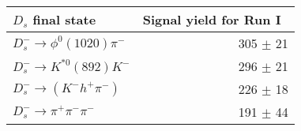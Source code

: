  \begin{tabular}{l r }
\hline\hline
$D_s$ final state  & Signal yield for Run I\ \\
\hline
$D_{s}^{-} \to \phi^{0}(1020)\pi^{-}$ & 305 $\pm$ 21 \\
$D_{s}^{-}\to K^{*0}(892)K^{-}$ & 296 $\pm$ 21 \\
$D_{s}^{-}\to (K^{-}h^{+}\pi^{-})$ & 226 $\pm$ 18 \\
$D_{s}^{-}\to \pi^{+}\pi^{-}\pi^{-}$ & 191 $\pm$ 44 \\
\hline\hline
\end{tabular}
\label{table:signalYieldsDs_run1}
